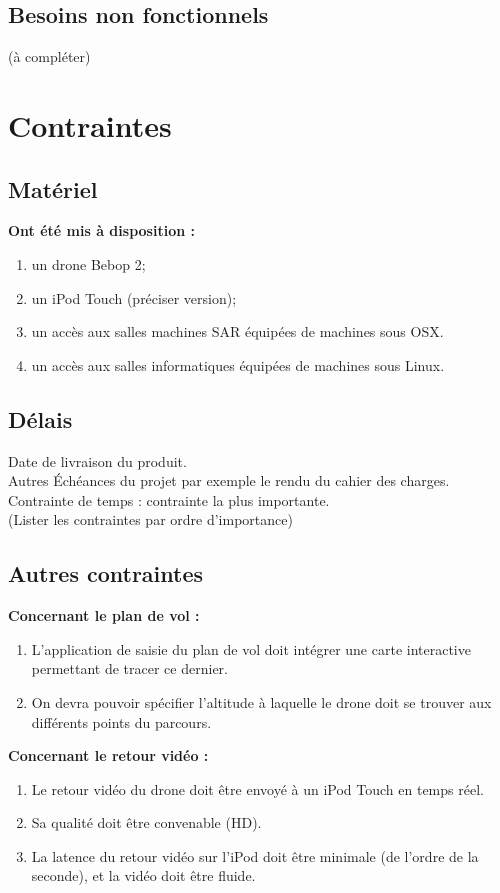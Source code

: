 \documentclass{article}
\begin{document}
	\subsection{Besoins non fonctionnels}
	(à compléter)\\
\section{Contraintes}
	\subsection{Matériel}
		\begin{flushleft}
	        \textbf{Ont été mis à disposition :}
	    \end{flushleft}
		\begin{enumerate}
        \item un drone Bebop 2;
        \item un iPod Touch (préciser version);
        \item un accès aux salles machines SAR équipées de machines sous OSX.
        \item un accès aux salles informatiques équipées de machines sous Linux.
        \end{enumerate}
	\subsection{Délais}
		Date de livraison du produit.\\
		Autres Échéances du projet par exemple le rendu du cahier des charges.
		Contrainte de temps : contrainte la plus importante.\\
		(Lister les contraintes par ordre d'importance)
	\subsection{Autres contraintes}
	    \begin{flushleft}
	        \textbf{Concernant le plan de vol :} 
	    \end{flushleft}
	    \begin{enumerate}
            \item  L'application de saisie du plan de vol doit intégrer une carte interactive permettant de tracer ce dernier.
    		 \item On devra pouvoir spécifier l'altitude à laquelle le drone doit se trouver aux différents points du parcours.
		 \end{enumerate}
		
	    \begin{flushleft}
	        \textbf{Concernant le retour vidéo :}
	    \end{flushleft}
	     \begin{enumerate}
	     \item	Le retour vidéo du drone doit être envoyé à un iPod Touch en temps réel.
	     \item	Sa qualité doit être convenable (HD).
		 \item La latence du retour vidéo sur l'iPod doit être minimale (de l'ordre de la seconde), et la vidéo doit être fluide.
		 \end{enumerate}
		
\end{document}
